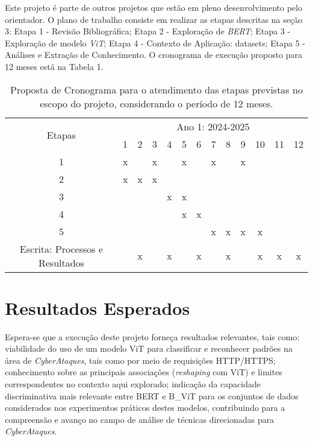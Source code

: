 Este projeto é parte de outros projetos que estão em pleno desenvolvimento pelo orientador. O plano de trabalho consiste em realizar as etapas descritas na seção 3: Etapa 1 - Revisão Bibliográfica; Etapa 2 - Exploração de \textit{BERT}; Etapa 3 - Exploração de modelo \textit{ViT}; Etapa 4 - Contexto de Aplicação: datasets; Etapa 5 - Análises e Extração de Conhecimento. O cronograma de execução proposto para 12 meses está na Tabela 1. 
\begin{table}[h]

\caption{Proposta de Cronograma para o atendimento das etapas previstas no escopo do projeto, considerando o período de 12 meses.}

\label{tab:cronograma}
	\centering
		\begin{tabular} {|c|c|c|c|c|c|c|c|c|c|c|c|c|}
		\hline
		\multirow{2}{*}{Etapas}
		&\multicolumn{12}{c|}{Ano 1: 2024-2025}\\ \cline{2-13}
		&1&2&3&4&5&6&7&8&9&10&11&12\\
		\hline
		1&x&&x&&x&&x&&x&&&\\
		\hline
		2&x&x&x&&&&&&&&&\\
		\hline	
		3&&&&x&x&&&&&&&\\
		\hline			
		4&&&&&x&x&&&&&&\\
		\hline	
		5&&&&&&&x&x&x&x&&\\
		\hline	
		

		Escrita: Processos e Resultados&&x&&x&&x&&x&&x&x&x\\
		\hline
		\end{tabular}
\end{table}
\section{Resultados Esperados}

Espera-se que a execução deste projeto forneça resultados relevantes, tais como: viabilidade do uso de um modelo ViT para classificar e reconhecer padrões na área de \textit{CyberAtaques},  tais como por meio de requisições HTTP/HTTPS; conhecimento sobre as principais associações (\textit{reshaping} com ViT) e limites correspondentes no contexto aqui explorado; indicação da capacidade discriminativa mais relevante entre BERT e B\_ViT para os conjuntos de dados considerados nos experimentos práticos destes modelos, contribuindo para a compreensão e avanço no campo de análise de técnicas direcionadas para \textit{CyberAtaques}.

